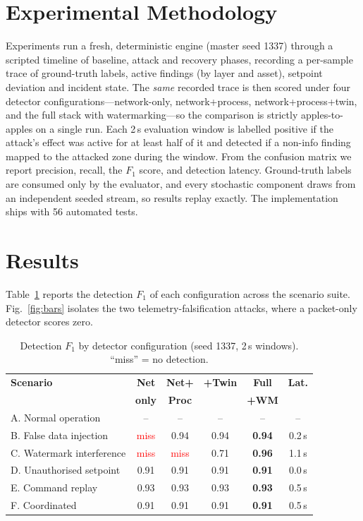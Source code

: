 \documentclass[conference]{IEEEtran}
\begin{document}
\section{Experimental Methodology}
Experiments run a fresh, deterministic engine (master seed 1337) through a scripted timeline of baseline, attack and recovery phases, recording a per-sample trace of ground-truth labels, active findings (by layer and asset), setpoint deviation and incident state. The \emph{same} recorded trace is then scored under four detector configurations---network-only, network+process, network+process+twin, and the full stack with watermarking---so the comparison is strictly apples-to-apples on a single run. Each 2\,s evaluation window is labelled positive if the attack's effect was active for at least half of it and detected if a non-info finding mapped to the attacked zone during the window. From the confusion matrix we report precision, recall, the $F_1$ score, and detection latency. Ground-truth labels are consumed only by the evaluator, and every stochastic component draws from an independent seeded stream, so results replay exactly. The implementation ships with 56 automated tests.

\section{Results}
Table~\ref{tab:results} reports the detection $F_1$ of each configuration across the scenario suite. Fig.~\ref{fig:bars} isolates the two telemetry-falsification attacks, where a packet-only detector scores zero.

\begin{table}[t]
\centering
\caption{Detection $F_1$ by detector configuration (seed 1337, 2\,s windows). ``miss'' = no detection.}
\label{tab:results}
\renewcommand{\arraystretch}{1.18}
\setlength{\tabcolsep}{3.4pt}
\begin{tabular}{@{}lccccc@{}}
\toprule
\textbf{Scenario} & \textbf{Net} & \textbf{Net+} & \textbf{+Twin} & \textbf{Full} & \textbf{Lat.}\\
 & \textbf{only} & \textbf{Proc} & & \textbf{+WM} & \\
\midrule
A. Normal operation      & --   & --   & --   & --   & --\\
B. False data injection   & \textcolor{red}{miss} & 0.94 & 0.94 & \textbf{0.94} & 0.2\,s\\
C. Watermark interference & \textcolor{red}{miss} & \textcolor{red}{miss} & 0.71 & \textbf{0.96} & 1.1\,s\\
D. Unauthorised setpoint  & 0.91 & 0.91 & 0.91 & \textbf{0.91} & 0.0\,s\\
E. Command replay         & 0.93 & 0.93 & 0.93 & \textbf{0.93} & 0.5\,s\\
F. Coordinated            & 0.91 & 0.91 & 0.91 & \textbf{0.91} & 0.5\,s\\
\bottomrule
\end{tabular}
\end{table}
\end{document}
